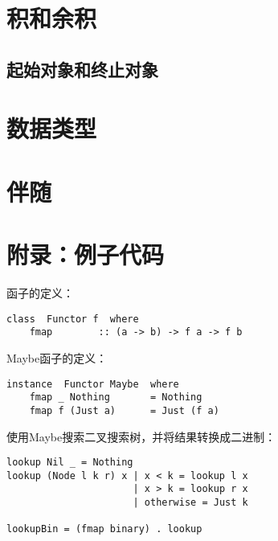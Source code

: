 \documentclass{article}
\begin{document}
\section{积和余积}

\subsection{起始对象和终止对象}

\section{数据类型}

\section{伴随}

\section{附录：例子代码}

函子的定义：

\lstset{frame=single}
\begin{lstlisting}[style=Haskell]
class  Functor f  where
    fmap        :: (a -> b) -> f a -> f b
\end{lstlisting}

Maybe函子的定义：

\begin{lstlisting}
instance  Functor Maybe  where
    fmap _ Nothing       = Nothing
    fmap f (Just a)      = Just (f a)
\end{lstlisting}

使用Maybe搜索二叉搜索树，并将结果转换成二进制：

\begin{lstlisting}[style=Haskell]
lookup Nil _ = Nothing
lookup (Node l k r) x | x < k = lookup l x
                      | x > k = lookup r x
                      | otherwise = Just k

lookupBin = (fmap binary) . lookup
\end{lstlisting}
\end{document}
